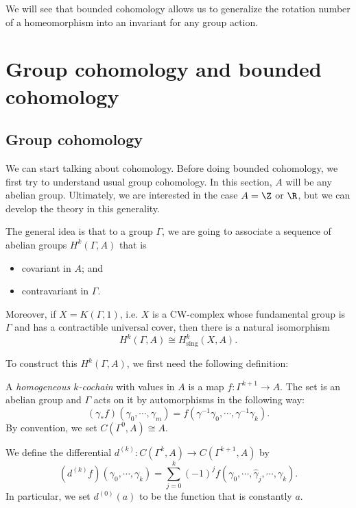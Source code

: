 \documentclass[a4paper]{article}
\begin{document}
We will see that bounded cohomology allows us to generalize the rotation number of a homeomorphism into an invariant for any group action.

\section{Group cohomology and bounded cohomology}
\subsection{Group cohomology}
We can start talking about cohomology. Before doing bounded cohomology, we first try to understand usual group cohomology. In this section, $A$ will be any abelian group. Ultimately, we are interested in the case $A = \Z$ or $\R$, but we can develop the theory in this generality.

The general idea is that to a group $\Gamma$, we are going to associate a sequence of abelian groups $H^k(\Gamma, A)$ that is
\begin{itemize}
  \item covariant in $A$; and
  \item contravariant in $\Gamma$.
\end{itemize}
Moreover, if $X = K(\Gamma, 1)$, i.e. $X$ is a CW-complex whose fundamental group is $\Gamma$ and has a contractible universal cover, then there is a natural isomorphism
\[
  H^k(\Gamma, A) \cong H^k_{\mathrm{sing}}(X, A).
\]

To construct this $H^k(\Gamma, A)$, we first need the following definition:
\begin{defi}
  A \emph{homogeneous $k$-cochain} with values in $A$ is a map $f: \Gamma^{k + 1} \to A$. The set  is an abelian group and $\Gamma$ acts on it by automorphisms in the following way:
  \[
    (\gamma_* f) (\gamma_0, \cdots, \gamma_m) = f(\gamma^{-1} \gamma_0, \cdots, \gamma^{-1} \gamma_k).
  \]
  By convention, we set $C(\Gamma^0, A) \cong A$.
\end{defi}

\begin{defi}[Differential $d^{(k)}$]
  We define the differential $d^{(k)}: C(\Gamma^k, A) \to C(\Gamma^{k + 1}, A)$ by
  \[
    (d^{(k)}f) (\gamma_0, \cdots, \gamma_k) = \sum_{j = 0}^k (-1)^j f(\gamma_0, \cdots, \hat{\gamma}_j, \cdots, \gamma_k).
  \]
  In particular, we set $d^{(0)}(a)$ to be the function that is constantly $a$.
\end{defi}
\end{document}
